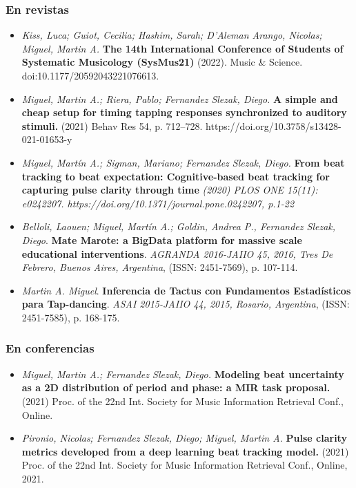 \documentclass[a4paper,10pt]{article}
\begin{document}
\subsubsection{En revistas}
\begin{itemize}
  \item \emph{Kiss, Luca; Guiot, Cecilia; Hashim, Sarah; D’Aleman Arango,
    Nicolas; Miguel, Martin A.}
    \textbf{The 14th
    International Conference of Students of Systematic Musicology (SysMus21)}
    (2022). Music \& Science. doi:10.1177/20592043221076613.

  \item\emph{Miguel, Martin A.; Riera, Pablo; Fernandez Slezak, Diego.} 
    \textbf{A simple and cheap setup for timing tapping responses synchronized
    to auditory stimuli.} (2021) Behav Res 54, p. 712–728. https://doi.org/10.3758/s13428-021-01653-y

  \item 
    \emph{Miguel, Martín A.; Sigman, Mariano; Fernandez Slezak, Diego.}
    \textbf{From beat tracking to beat expectation: Cognitive-based beat
    tracking for capturing pulse clarity through time} 
    \emph{(2020) PLOS ONE 15(11): e0242207.
        https://doi.org/10.1371/journal.pone.0242207, p.1-22}
    \item 
\emph{Belloli, Laouen; Miguel, Martín A.; Goldin, Andrea P., Fernandez Slezak,
        Diego}.
\textbf{Mate Marote: a BigData platform for massive scale educational
        interventions}.
        \emph{AGRANDA 2016-JAIIO 45, 2016, Tres De Febrero, Buenos Aires,
        Argentina}, (ISSN: 2451-7569), p. 107-114.
    \item 
\emph{Martin A. Miguel}.
\textbf{Inferencia de Tactus con Fundamentos Estadísticos para Tap-dancing}.
        \emph{ASAI 2015-JAIIO 44, 2015, Rosario, Argentina}, (ISSN: 2451-7585),
        p. 168-175.
\end{itemize}

\subsubsection{En conferencias}
\begin{itemize}
 \item\emph{Miguel, Martin A.; Fernandez Slezak, Diego.} 
   \textbf{Modeling beat uncertainty as a 2D distribution of period and
   phase: a MIR task proposal.} (2021) 
   Proc. of the 22nd Int. Society for Music Information Retrieval Conf., Online.

 \item \emph{Pironio, Nicolas; Fernandez Slezak, Diego; Miguel, Martin A.} 
     \textbf{Pulse clarity metrics developed from a deep learning beat tracking
     model.} (2021) Proc. of the 22nd Int. Society for Music Information
Retrieval Conf., Online, 2021.
\end{itemize}
\end{document}
